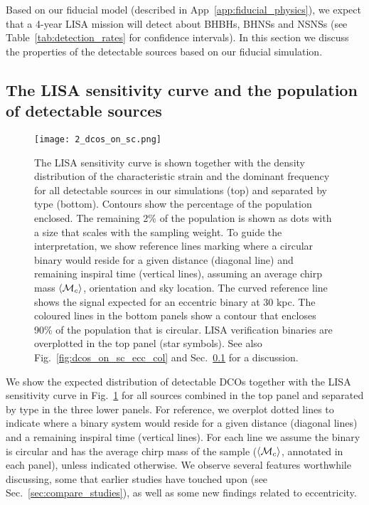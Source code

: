 Based on our fiducial model (described in App~\ref{app:fiducial_physics}), we expect that a 4-year LISA mission will detect about \BHBHFourYear{} BHBHs, \BHNSFourYear{} BHNSs and \NSNSFourYear{} NSNSs (see Table~\ref{tab:detection_rates} for confidence intervals). In this section we discuss the properties of the detectable sources based on our fiducial simulation.

\subsection{The LISA sensitivity curve and the population of detectable sources}\label{sec:dcos_on_sc}
\begin{figure*}[p]
    \centering
    \texttt{[image: 2\_dcos\_on\_sc.png]}
    \caption{The LISA sensitivity curve is shown together with the density distribution of the characteristic strain and the dominant frequency for all detectable sources in our simulations (top) and separated by type (bottom). Contours show the percentage of the population enclosed. The remaining 2\% of the population is shown as dots with a size that scales with the sampling weight. To guide the interpretation, we show reference lines marking where a circular binary would reside for a given distance (diagonal line) and remaining inspiral time (vertical lines), assuming an average chirp mass $\left\langle\mathcal{M}_c\right\rangle$, orientation and sky location. The curved reference line shows the signal expected for an eccentric binary at 30 kpc. The coloured lines in the bottom panels show a contour that encloses 90\% of the population that is circular. LISA verification binaries are overplotted in the top panel (star symbols).  See also Fig.~\ref{fig:dcos_on_sc_ecc_col} and Sec.~\ref{sec:dcos_on_sc} for a discussion.}
    \label{fig:dcos_on_sc}
\end{figure*}
We show the expected distribution of detectable DCOs together with the LISA sensitivity curve in Fig.~\ref{fig:dcos_on_sc} for all sources combined in the top panel and separated by type in the three lower panels. For reference, we overplot dotted lines to indicate where a binary system would reside for a given distance (diagonal lines) and a remaining inspiral time (vertical lines). For each line we assume the binary is circular and has the average chirp mass of the sample ($\left\langle\mathcal{M}_c\right\rangle$, annotated in each panel), unless indicated otherwise. We observe several features worthwhile discussing, some that earlier studies have touched upon (see Sec.~\ref{sec:compare_studies}), as well as some new findings related to eccentricity.

